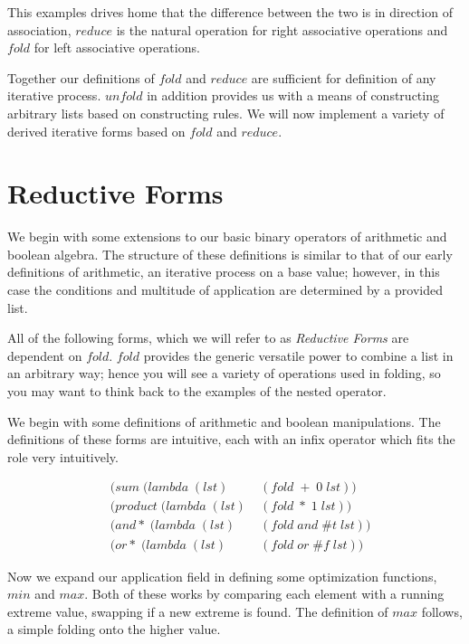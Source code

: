 This examples drives home that the difference between the two is in direction of 
association, $reduce$ is the natural operation for right associative operations 
and $fold$ for left associative operations.

Together our definitions of $fold$ and $reduce$ are sufficient for definition of 
any iterative process. $unfold$ in addition provides us with a means of 
constructing arbitrary lists based on constructing rules. We will now implement a 
variety of derived iterative forms based on $fold$ and $reduce$.

\section{Reductive Forms}
We begin with some extensions to our basic binary operators of arithmetic and 
boolean algebra. The structure of these definitions is similar to that of our 
early definitions of arithmetic, an iterative process on a base value; however, in 
this case the conditions and multitude of application are determined by a provided 
list.

All of the following forms, which we will refer to as \emph{Reductive Forms} are 
dependent on $fold$. $fold$ provides the generic versatile power to combine a list 
in an arbitrary way; hence you will see a variety of operations used in folding, 
so you may want to think back to the examples of the nested operator.

We begin with some definitions of arithmetic and boolean manipulations. The 
definitions of these forms are intuitive, each with an infix operator which fits 
the role very intuitively.

\begin{figure}[htp]
\caption{}\label{fig:folders}
\begin{align*}
& (sum \; (lambda \; (lst) \; &(fold \; + \; 0 \; lst))
\\& (product \; (lambda \; (lst) \; &(fold \; * \; 1 \; lst))
\\& (and* \; (lambda \; (lst) \; &(fold \; and \; \#t \; lst))
\\& (or* \; (lambda \; (lst) \; &(fold \; or \; \#f \; lst))
\end{align*}
\end{figure}

Now we expand our application field in defining some optimization functions, $min$ 
and $max$. Both of these works by comparing each element with a running extreme 
value, swapping if a new extreme is found. The definition of $max$ follows, a 
simple folding onto the higher value.

